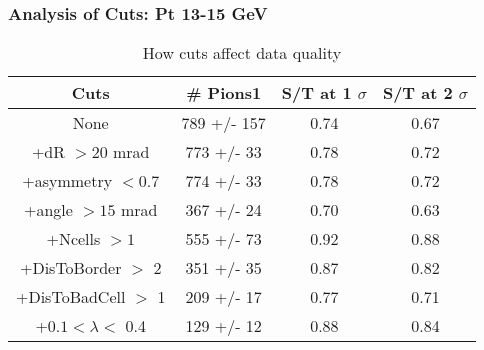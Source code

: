 \frame
{
\frametitle{Analysis of Cuts: Pt 13-15 GeV}
\begin{table}
\caption{How cuts affect data quality}
\centering
\begin{tabular}{c c c c}
\hline\hline
Cuts & \# Pions1 & S/T at 1 $\sigma$ & S/T at 2 $\sigma$ \\ [0.5ex]
\hline
None &  789 +/-  157 & 0.74 & 0.67 \\ %
+dR $> 20$ mrad &  773 +/-   33 & 0.78 & 0.72 \\ %
+asymmetry $< 0.7$ &  774 +/-   33 & 0.78 & 0.72 \\ %
+angle $> 15$ mrad &  367 +/-   24 & 0.70 & 0.63 \\ %
+Ncells $> 1$&  555 +/-   73 & 0.92 & 0.88 \\ %
+DisToBorder $>$ 2 &  351 +/-   35 & 0.87 & 0.82 \\ %
+DisToBadCell $>$ 1&  209 +/-   17 & 0.77 & 0.71 \\ %
+$0.1 < \lambda <$ 0.4 &  129 +/-   12 & 0.88 & 0.84 \\ %
[1ex]
\hline
\end{tabular}
\label{table:nonlin}
\end{table}
}
